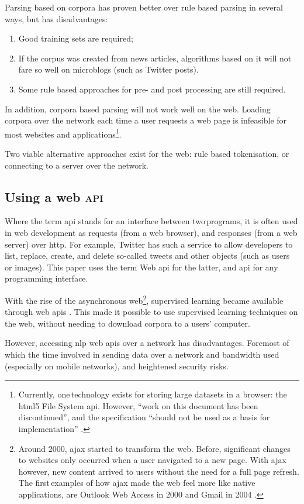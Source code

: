 Parsing based on corpora has proven better over rule based
  parsing in several ways, but has disadvantages:

\begin{enumerate}
\item Good training sets are required;
\item If the corpus was created from news articles, algorithms based on it
  will not fare so well on microblogs (such as Twitter posts).
\item Some rule based approaches for pre- and post processing are still
  required.
\end{enumerate}

\noindent In addition, corpora based parsing will not work well on the web.
Loading corpora over the network each time a user requests a web page is
  infeasible for most websites and applications\footnote{Currently,
      one\,technology exists for storing large datasets in a browser: the
      \acrshort{html5} File System \acrshort{api}.
    However, ``work on this document has been discontinued'', and the
      specification ``should not be used as a basis for implementation''
      \autocite{urhane-file-api}.}.

Two viable alternative approaches exist for the web: rule based tokenisation,
  or connecting to a server over the network.

\subsection{Using a web \textsc{api}}\label{using-a-web}

Where the term \gls{api} stands for an interface between two\,programs,
  it is often used in web development as requests (from a web browser),
  and responses (from a web server) over \gls{http}.
For example, Twitter has such a service to allow developers to list,
  replace, create, and delete so-called tweets and other objects (such as
  users or images).
This paper uses the term Web \gls{api} for the latter, and \gls{api} for
any programming interface.

With the rise of the asynchronous web\footnote{Around 2000,
    \gls{ajax} started to transform the web.
  Before, significant changes to websites only occurred when a user
    navigated to a new page. 
  With \gls{ajax} however, new content arrived to users without the need
    for a full page refresh.
  The first\,examples of how \gls{ajax} made the web feel more like native
    applications, are Outlook Web Access in 2000
    \autocite{technet-outlook-web-access} and Gmail in 2004
    \autocite{gmailblog-gmail-ajax}.},
  supervised learning became available through web \glspl{api}
  \autocites{textteaser-web-api}{wordnet-web-api}{textrazor-web-api}.
This made it possible to use supervised learning techniques on the web,
  without needing to download corpora to a users' computer.

However, accessing \gls{nlp} web \glspl{api} over a network has
  disadvantages.
Foremost of which the time involved in sending data over a network and
  bandwidth used (especially on mobile networks), and heightened security
  risks.
